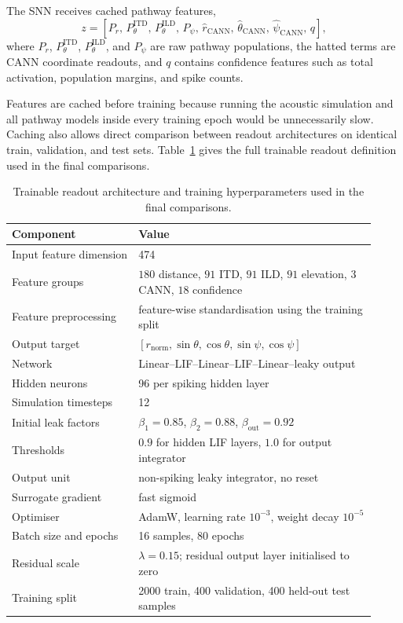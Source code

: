 The SNN receives cached pathway features,
\begin{equation}
    z =
    \left[
    P_r,\,
    P^{\mathrm{ITD}}_{\theta},\,
    P^{\mathrm{ILD}}_{\theta},\,
    P_{\psi},\,
    \hat{r}_{\mathrm{CANN}},\,
    \hat{\theta}_{\mathrm{CANN}},\,
    \hat{\psi}_{\mathrm{CANN}},\,
    q
    \right],
\end{equation}
where $P_r$, $P^{\mathrm{ITD}}_{\theta}$, $P^{\mathrm{ILD}}_{\theta}$, and $P_{\psi}$ are raw pathway populations, the hatted terms are CANN coordinate readouts, and $q$ contains confidence features such as total activation, population margins, and spike counts.

Features are cached before training because running the acoustic simulation and all pathway models inside every training epoch would be unnecessarily slow. Caching also allows direct comparison between readout architectures on identical train, validation, and test sets. Table~\ref{tab:trainable_snn_architecture} gives the full trainable readout definition used in the final comparisons.

\begin{table}[H]
\centering
\caption{Trainable readout architecture and training hyperparameters used in the final comparisons.}
\label{tab:trainable_snn_architecture}
\begin{tabular}{p{0.32\linewidth}p{0.60\linewidth}}
\toprule
Component & Value \\
\midrule
Input feature dimension & 474 \\
Feature groups & $180$ distance, $91$ ITD, $91$ ILD, $91$ elevation, $3$ CANN, $18$ confidence \\
Feature preprocessing & feature-wise standardisation using the training split \\
Output target & $[r_{\mathrm{norm}}, \sin\theta, \cos\theta, \sin\psi, \cos\psi]$ \\
Network & Linear--LIF--Linear--LIF--Linear--leaky output \\
Hidden neurons & 96 per spiking hidden layer \\
Simulation timesteps & 12 \\
Initial leak factors & $\beta_1=0.85$, $\beta_2=0.88$, $\beta_{\mathrm{out}}=0.92$ \\
Thresholds & $0.9$ for hidden LIF layers, $1.0$ for output integrator \\
Output unit & non-spiking leaky integrator, no reset \\
Surrogate gradient & fast sigmoid \\
Optimiser & AdamW, learning rate $10^{-3}$, weight decay $10^{-5}$ \\
Batch size and epochs & 16 samples, 80 epochs \\
Residual scale & $\lambda=0.15$; residual output layer initialised to zero \\
Training split & 2000 train, 400 validation, 400 held-out test samples \\
\bottomrule
\end{tabular}
\end{table}


